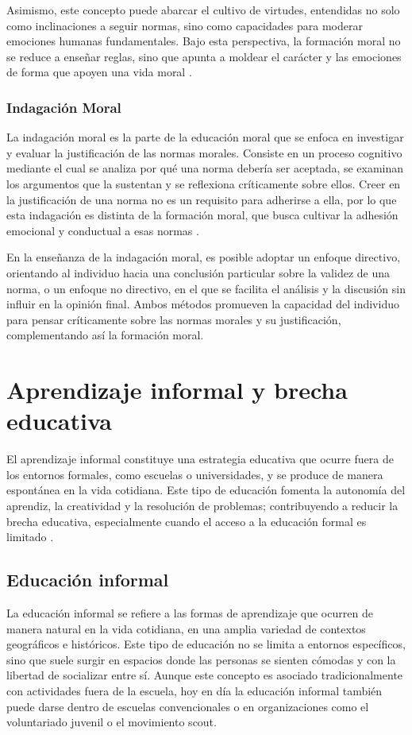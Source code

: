 Asimismo, este concepto puede abarcar el cultivo de virtudes, entendidas no
solo como inclinaciones a seguir normas, sino como capacidades para moderar
emociones humanas fundamentales. Bajo esta perspectiva, la formación moral no
se reduce a enseñar reglas, sino que apunta a moldear el carácter y las
emociones de forma que apoyen una vida moral \cite{hand2017moral}.

\subsubsection{Indagación Moral}
La indagación moral es la parte de la educación moral que se enfoca en
investigar y evaluar la justificación de las normas morales. Consiste en un
proceso cognitivo mediante el cual se analiza por qué una norma debería ser
aceptada, se examinan los argumentos que la sustentan y se reflexiona
críticamente sobre ellos. Creer en la justificación de una norma no es un
requisito para adherirse a ella, por lo que esta indagación es distinta de la
formación moral, que busca cultivar la adhesión emocional y conductual a esas
normas \cite{hand2017moral}.

En la enseñanza de la indagación moral, es posible adoptar un enfoque
directivo, orientando al individuo hacia una conclusión particular sobre la
validez de una norma, o un enfoque no directivo, en el que se facilita el
análisis y la discusión sin influir en la opinión final. Ambos métodos
promueven la capacidad del individuo para pensar críticamente sobre las normas
morales y su justificación, complementando así la formación moral.
\cite{hand2017moral}

\section{Aprendizaje informal y brecha educativa}
El aprendizaje informal constituye una estrategia educativa que ocurre fuera de
los entornos formales, como escuelas o universidades, y se produce de manera
espontánea en la vida cotidiana. Este tipo de educación fomenta la autonomía
del aprendiz, la creatividad y la resolución de problemas; contribuyendo a
reducir la brecha educativa, especialmente cuando el acceso a la educación
formal es limitado \cite{coombs1968world, mills2014informal}.

\subsection{Educación informal}
La educación informal se refiere a las formas de aprendizaje que ocurren de
manera natural en la vida cotidiana, en una amplia variedad de contextos
geográficos e históricos. Este tipo de educación no se limita a entornos
específicos, sino que suele surgir en espacios donde las personas se sienten
cómodas y con la libertad de socializar entre sí. Aunque este concepto es
asociado tradicionalmente con actividades fuera de la escuela, hoy en día la
educación informal también puede darse dentro de escuelas convencionales o en
organizaciones como el voluntariado juvenil o el movimiento scout.
\cite{mills2014informal}

